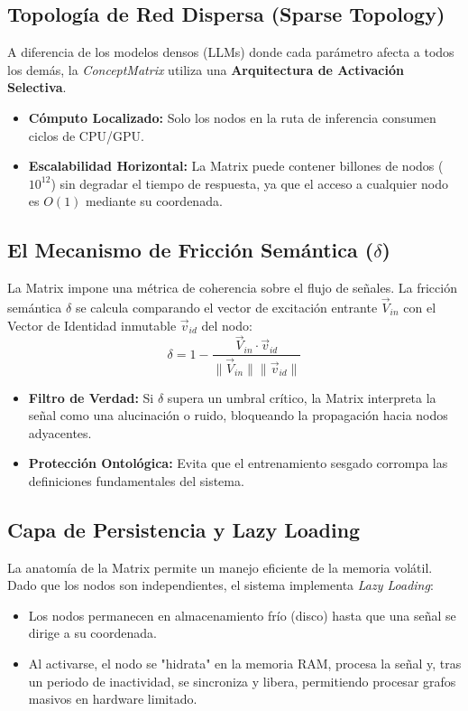 \documentclass[12pt]{article}
\begin{document}
\subsection{Topología de Red Dispersa (Sparse Topology)}
A diferencia de los modelos densos (LLMs) donde cada parámetro afecta a todos los demás, la \textit{ConceptMatrix} utiliza una \textbf{Arquitectura de Activación Selectiva}.
\begin{itemize}
	\item \textbf{Cómputo Localizado:} Solo los nodos en la ruta de inferencia consumen ciclos de CPU/GPU.
	\item \textbf{Escalabilidad Horizontal:} La Matrix puede contener billones de nodos ($10^{12}$) sin degradar el tiempo de respuesta, ya que el acceso a cualquier nodo es $O(1)$ mediante su coordenada.
\end{itemize}



\subsection{El Mecanismo de Fricción Semántica ($\delta$)}
La Matrix impone una métrica de coherencia sobre el flujo de señales. La fricción semántica $\delta$ se calcula comparando el vector de excitación entrante $\vec{V}_{in}$ con el Vector de Identidad inmutable $\vec{v}_{id}$ del nodo:
\begin{equation}
	\delta = 1 - \frac{\vec{V}_{in} \cdot \vec{v}_{id}}{\|\vec{V}_{in}\| \|\vec{v}_{id}\|}
\end{equation}
\begin{itemize}
	\item \textbf{Filtro de Verdad:} Si $\delta$ supera un umbral crítico, la Matrix interpreta la señal como una alucinación o ruido, bloqueando la propagación hacia nodos adyacentes.
	\item \textbf{Protección Ontológica:} Evita que el entrenamiento sesgado corrompa las definiciones fundamentales del sistema.
\end{itemize}

\subsection{Capa de Persistencia y Lazy Loading}
La anatomía de la Matrix permite un manejo eficiente de la memoria volátil. Dado que los nodos son independientes, el sistema implementa \textit{Lazy Loading}:
\begin{itemize}
	\item Los nodos permanecen en almacenamiento frío (disco) hasta que una señal se dirige a su coordenada.
	\item Al activarse, el nodo se "hidrata" en la memoria RAM, procesa la señal y, tras un periodo de inactividad, se sincroniza y libera, permitiendo procesar grafos masivos en hardware limitado.
\end{itemize}
\end{document}
